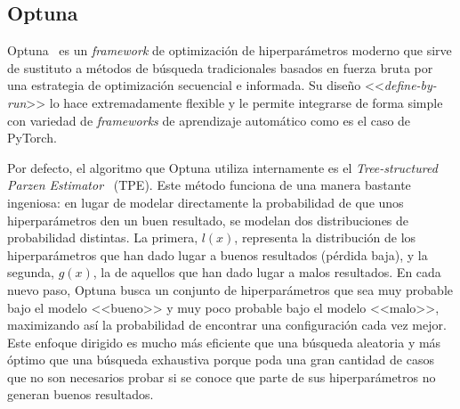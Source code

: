 \subsection{Optuna}

Optuna~\cite{optuna_2019} es un \textit{framework} de optimización de hiperparámetros moderno que sirve de sustituto a métodos de búsqueda tradicionales basados en fuerza bruta por una estrategia de optimización secuencial e informada. Su diseño <<\textit{define-by-run}>> lo hace extremadamente flexible y le permite integrarse de forma simple con variedad de \textit{frameworks} de aprendizaje automático como es el caso de PyTorch.

Por defecto, el algoritmo que Optuna utiliza internamente es el \textit{Tree-structured Parzen Estimator}~\cite{watanabe2023tree} (TPE). Este método funciona de una manera bastante ingeniosa: en lugar de modelar directamente la probabilidad de que unos hiperparámetros den un buen resultado, se modelan dos distribuciones de probabilidad distintas. La primera, $l(x)$, representa la distribución de los hiperparámetros que han dado lugar a buenos resultados (pérdida baja), y la segunda, $g(x)$, la de aquellos que han dado lugar a malos resultados. En cada nuevo paso, Optuna busca un conjunto de hiperparámetros que sea muy probable bajo el modelo <<bueno>> y muy poco probable bajo el modelo <<malo>>, maximizando así la probabilidad de encontrar una configuración cada vez mejor. Este enfoque dirigido es mucho más eficiente que una búsqueda aleatoria y más óptimo que una búsqueda exhaustiva porque poda una gran cantidad de casos que no son necesarios probar si se conoce que parte de sus hiperparámetros no generan buenos resultados.


